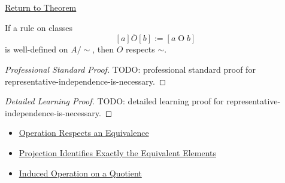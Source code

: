 \newpage
{}
\label{prf:representative-independence-is-necessary}

\begin{remark*}[Return]
\hyperref[prop:representative-independence-is-necessary]{Return to Theorem}
\end{remark*}

\begin{proposition*}
If a rule on classes
\[
[a]\mathbin{\overline{O}}[b]:=[a\mathbin{O}b]
\]
is well-defined on $A/{\sim}$, then $O$ respects $\sim$.
\end{proposition*}

\begin{proof}[Professional Standard Proof]
\LRAProofBodyStart
TODO: professional standard proof for representative-independence-is-necessary.
\end{proof}

\begin{proof}[Detailed Learning Proof]
\LRAProofBodyStart
TODO: detailed learning proof for representative-independence-is-necessary.
\end{proof}

\begin{remark*}
\end{remark*}

\begin{dependencies}
\begin{itemize}
  \item \hyperref[def:operation-respects-equivalence]{Operation Respects an Equivalence}
  \item \hyperref[prop:projection-identifies-equivalent-elements]{Projection Identifies Exactly the Equivalent Elements}
  \item \hyperref[thm:induced-operation-on-quotient]{Induced Operation on a Quotient}
\end{itemize}
\end{dependencies}

\clearpage
